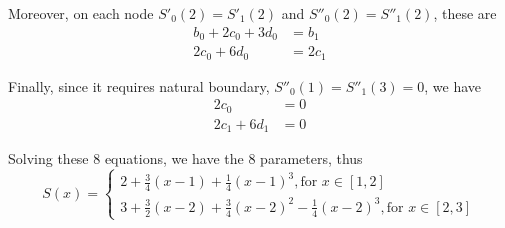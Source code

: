 \begin{enumerate}
\begin{solution}
		Moreover, on each node $S'_0(2) = S'_1(2)$ and $S''_0(2) = S''_1(2)$, these are
		\begin{align*}
		b_0 + 2c_0 + 3d_0 &= b_1\\
		2c_0 + 6d_0 &= 2c_1
		\end{align*} 
		
		Finally, since it requires natural boundary, $S''_0(1) = S''_1(3) = 0$, we have
		\begin{align*}
		2c_0 &= 0\\
		2c_1 + 6d_1 &= 0
		\end{align*}
		
		Solving these 8 equations, we have the 8 parameters, thus
		\[ S(x) = 
		\begin{cases}
		2 + \frac{3}{4}(x-1) + \frac{1}{4}(x-1)^3, \text{for $x\in [1,2]$}\\
		3 + \frac{3}{2}(x-2) + \frac{3}{4}(x-2)^2 - \frac{1}{4}(x-2)^3, \text{for $x\in [2,3]$} 
		\end{cases} \]
	\end{solution}
\end{enumerate}







